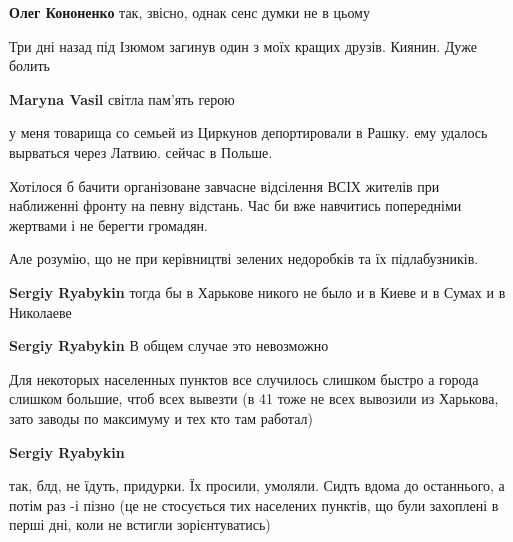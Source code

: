 \begin{itemize}
\begin{itemize}
\textbf{Олег Кононенко} так, звісно, однак сенс думки не в цьому
\end{itemize} %


Три дні назад під Ізюмом загинув один з моїх кращих друзів. Киянин. Дуже болить

\textbf{Maryna Vasil} світла пам'ять герою


у меня товарища со семьей из Циркунов депортировали в Рашку. ему удалось
вырваться через Латвию. сейчас в Польше.


Хотілося б бачити організоване завчасне відсілення ВСІХ жителів при наближенні
фронту на певну відстань. Час би вже навчитись попередніми жертвами і не
берегти громадян.

Але розумію, що не при керівництві зелених недоробків та їх підлабузників.

\begin{itemize} %
\textbf{Sergiy Ryabykin} тогда бы в Харькове никого не было и в Киеве и в Сумах и в Николаеве

\textbf{Sergiy Ryabykin} В общем случае это невозможно

Для некоторых населенных пунктов все случилось слишком быстро а города слишком
большие, чтоб всех вывезти (в 41 тоже не всех вывозили из Харькова, зато заводы
по максимуму и тех кто там работал)

\textbf{Sergiy Ryabykin} 

так, блд, не їдуть, придурки. Їх просили, умоляли. Сидть вдома до останнього, а
потім раз -і пізно (це не стосується тих населених пунктів, що були захоплені в
перші дні, коли не встигли зорієнтуватись)

\end{itemize} %

\end{itemize} %
